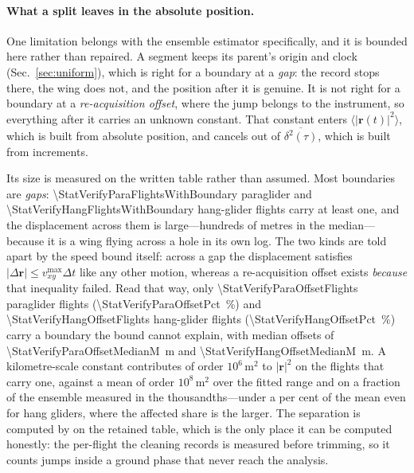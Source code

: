 \begin{revblock}
\paragraph{What a split leaves in the absolute position.}
One limitation belongs with the ensemble estimator specifically, and it is bounded here
rather than repaired. A segment keeps its parent's origin and clock
(Sec.~\ref{sec:uniform}), which is right for a boundary at a \emph{gap}: the record stops
there, the wing does not, and the position after it is genuine. It is not right for a
boundary at a \emph{re-acquisition offset}, where the jump belongs to the instrument, so
everything after it carries an unknown constant. That constant enters
$\langle|\mathbf{r}(t)|^2\rangle$, which is built from absolute position, and cancels out
of $\overline{\delta^2(\tau)}$, which is built from increments.

Its size is measured on the written table rather than assumed. Most boundaries are
\emph{gaps}: \num{\StatVerifyParaFlightsWithBoundary} paraglider and
\num{\StatVerifyHangFlightsWithBoundary} hang-glider flights carry at least one, and the
displacement across them is large---hundreds of metres in the median---because it is a
wing flying across a hole in its own log. The two kinds are told apart by the speed bound
itself: across a gap the displacement satisfies $|\Delta\mathbf{r}|\le
v_{xy}^{\max}\Delta t$ like any other motion, whereas a re-acquisition offset exists
\emph{because} that inequality failed. Read that way, only
\num{\StatVerifyParaOffsetFlights} paraglider flights
(\SI{\StatVerifyParaOffsetPct}{\percent}) and \num{\StatVerifyHangOffsetFlights}
hang-glider flights (\SI{\StatVerifyHangOffsetPct}{\percent}) carry a boundary the bound
cannot explain, with median offsets of \SI{\StatVerifyParaOffsetMedianM}{\metre} and
\SI{\StatVerifyHangOffsetMedianM}{\metre}. A kilometre-scale constant contributes of order
$10^{6}\,\si{\metre\squared}$ to $|\mathbf{r}|^2$ on the flights that carry one, against a
mean of order $10^{8}\,\si{\metre\squared}$ over the fitted range and on a fraction of the
ensemble measured in the thousandths---under a per cent of the mean even for hang gliders,
where the affected share is the larger. The separation is computed by
 on the retained table, which is the only place it can be computed
honestly: the per-flight  the cleaning records is measured before
trimming, so it counts jumps inside a ground phase that never reach the analysis.


\end{revblock}

